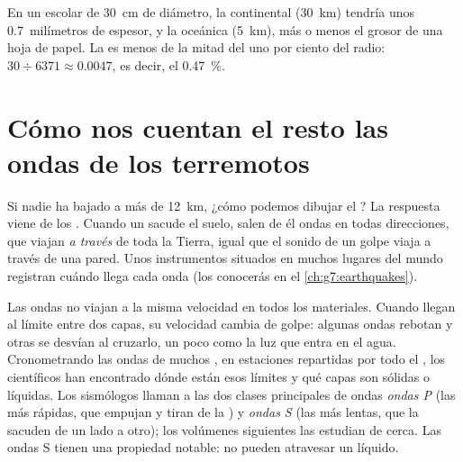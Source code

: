 \begin{remark}\label{rem:g6:inside-the-earth:thin-crust}
En un  escolar de 30~cm de diámetro, la  continental (30~km)
tendría unos 0.7~milímetros de espesor, y la  oceánica (5~km), más o
menos el grosor de una hoja de papel. La  es menos de la mitad del
uno por ciento del radio: $30 \div 6371 \approx 0.0047$, es decir, el
0.47~\%.
\end{remark}

\section{Cómo nos cuentan el resto las ondas de los terremotos}\label{sec:g6:inside-the-earth:waves}

Si nadie ha bajado a más de 12~km, ¿cómo podemos dibujar el ? La
respuesta viene de los . Cuando un  sacude el suelo,
salen de él ondas en todas direcciones, que viajan \emph{a través} de toda
la Tierra, igual que el sonido de un golpe viaja a través de una pared. Unos instrumentos situados en muchos lugares del mundo registran cuándo llega cada onda (los conocerás en el
\cref{ch:g7:earthquakes}).

Las ondas no viajan a la misma velocidad en todos los materiales. Cuando
llegan al límite entre dos capas, su velocidad cambia de golpe: algunas
ondas rebotan y otras se desvían al cruzarlo, un poco como la luz que entra
en el agua. Cronometrando las ondas de muchos , en estaciones repartidas por todo el , los científicos han encontrado dónde están esos límites y
qué capas son sólidas o líquidas. Los sismólogos llaman a las dos clases
principales de ondas \emph{ondas P} (las más rápidas, que empujan y tiran
de la ) y \emph{ondas S} (las más lentas, que la sacuden de un lado a
otro); los volúmenes siguientes las estudian de cerca. Las ondas S tienen
una propiedad notable: no pueden atravesar un líquido.

